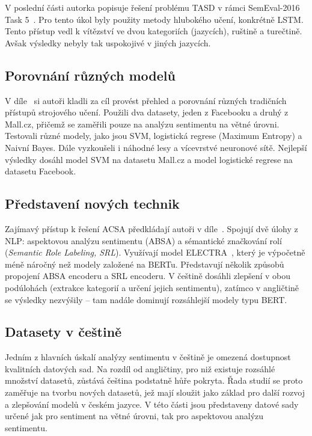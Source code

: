 V poslední části autorka popisuje řešení problému TASD v rámci SemEval-2016 Task 5~\cite{pontiki-etal-2016-semeval}. Pro tento úkol byly použity metody hlubokého učení, konkrétně LSTM. Tento přístup vedl k vítězství ve dvou kategoriích (jazycích), ruštině a turečtině. Avšak výsledky nebyly tak uspokojivé v jiných jazycích.~\cite{veselovska-2017}

\subsection{Porovnání různých modelů}
V díle~\cite{_ano_2019} si autoři kladli za cíl provést přehled a porovnání různých tradičních přístupů strojového učení. Použili dva datasety, jeden z Facebooku a druhý z Mall.cz, přičemž se zaměřili pouze na analýzu sentimentu na větné úrovni. Testovali různé modely, jako jsou SVM, logistická regrese (Maximum Entropy) a Naivní Bayes. Dále vyzkoušeli i náhodné lesy a vícevrstvé neuronové sítě. Nejlepší výsledky dosáhl model SVM na datasetu Mall.cz a model logistické regrese na datasetu Facebook.

\subsection{Představení nových technik}
Zajímavý přístup k řešení ACSA předkládají autoři v díle~\cite{priban-prazak-2023-improving}. Spojují dvě úlohy z NLP: aspektovou analýzu sentimentu (ABSA) a sémantické značkování rolí (\emph{Semantic Role Labeling, SRL}). Využívají model ELECTRA~\cite{clark2020electrapretrainingtextencoders}, který je výpočetně méně náročný než modely založené na BERTu. Představují několik způsobů propojení ABSA encoderu a SRL encoderu. V češtině dosáhli zlepšení v obou podúlohách (extrakce kategorií a určení jejich sentimentu), zatímco v angličtině se výsledky nezvýšily -- tam nadále dominují rozsáhlejší modely typu BERT.

\subsection{Datasety v češtině}
Jedním z hlavních úskalí analýzy sentimentu v češtině je omezená dostupnost kvalitních datových sad. Na rozdíl od angličtiny, pro niž existuje rozsáhlé množství datasetů, zůstává čeština podstatně hůře pokryta. Řada studií se proto zaměřuje na tvorbu nových datasetů, jež mají sloužit jako základ pro další rozvoj a zlepšování modelů v českém jazyce. V této části jsou představeny datové sady určené jak pro sentiment na větné úrovni, tak pro aspektovou analýzu sentimentu.

